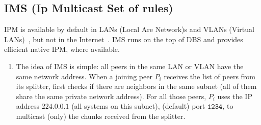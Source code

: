 \begin{center}
  \begin{figure*}
  \end{figure*}
  
  \begin{figure*}
  \end{figure*}
  
  \begin{figure*}
  \end{figure*}
  
  \begin{figure*}
  \end{figure*}
  
  \begin{figure*}
  \end{figure*}
  
  \begin{figure*}
  \end{figure*}
  
  \begin{figure*}
  \end{figure*}
  
  \begin{figure*}
  \end{figure*}
  
  \begin{figure*}
  \end{figure*}

\end{center}

\subsection{IMS (Ip Multicast Set of rules)}
IPM is available by default in LANs (Local Are Network)s and VLANs
(Virtual LANs)~\cite{shabtay2011ip}, but not in the
Internet~\cite{Comer1}. IMS runs on the top of DBS and provides
efficient native IPM, where available.

\begin{enumerate}
\item The idea of IMS is simple: all peers in the same LAN or VLAN
  have the same network address. When a joining peer $P_i$ receives
  the list of peers from its splitter, first checks if there are
  neighbors in the same subnet (all of them share the same private
  network address). For all those peers, $P_i$ uses the IP address
  $\mathtt{224.0.0.1}$ (all systems on this subnet), (default) port
  $\mathtt{1234}$, to multicast (only) the chunks received from the
  splitter.
\end{enumerate}


